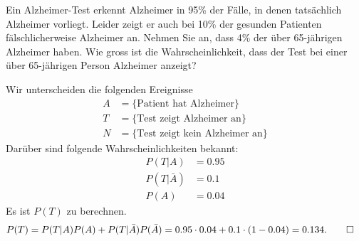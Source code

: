 Ein Alzheimer-Test erkennt Alzheimer in 95\% der Fälle, in denen tatsächlich
Alzheimer vorliegt. Leider zeigt er auch bei 10\% der gesunden Patienten
fälschlicherweise Alzheimer an. Nehmen Sie an, dass 4\% der über 65-jährigen
Alzheimer haben.
Wie gross ist die Wahrscheinlichkeit, dass der Test bei einer über
65-jährigen Person Alzheimer anzeigt?

\begin{loesung}
Wir unterscheiden die folgenden Ereignisse
\begin{align*}
A&=\{\text{Patient hat Alzheimer}\}
\\
T&=\{\text{Test zeigt Alzheimer an}\}
\\
N&=\{\text{Test zeigt kein Alzheimer an}\}
\end{align*}
Darüber sind folgende Wahrscheinlichkeiten bekannt:
\begin{align*}
P(T|A)&=0.95\\
P(T|\bar A)&=0.1\\
P(A)&=0.04
\end{align*}
Es ist $P(T)$ zu berechnen.
\begin{align*}
P(T)&=P(T|A)P(A)+P(T|\bar A)P(\bar A)=0.95\cdot 0.04 + 0.1\cdot (1-0.04)
=0.134.
\qedhere
\end{align*}
\end{loesung}

